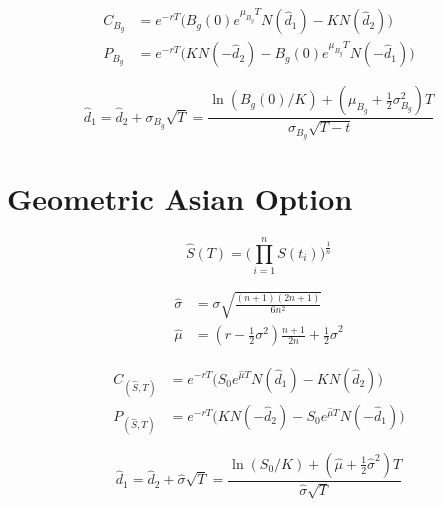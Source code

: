 \documentclass[paper=a4, fontsize=11pt, twocolumn]{scrartcl} %
\numberwithin{equation}{section} %
\numberwithin{figure}{section} %
\numberwithin{table}{section} %
\begin{document}
\begin{equation}
	\begin{split}
		C_{B_g} & = e^{-rT}\big(B_g(0)e^{\mu_{B_g}T}N(\hat{d}_1) - KN(\hat{d}_2)\big)\\
		P_{B_g} & = e^{-rT}\big(KN(-\hat{d}_2) -B_g(0)e^{\mu_{B_g}T}N(-\hat{d}_1)  \big)
	\end{split}
\end{equation}

\begin{equation}
	\hat{d}_1=\hat{d}_2+\sigma_{B_g} \sqrt{T}=\frac{\ln(B_g(0)/K)+(\mu_{B_g}+\frac{1}{2}\sigma^2_{B_g})T}{\sigma_{B_g}\sqrt{T-t}}
\end{equation}

\section{Geometric Asian Option}
\begin{equation}
	\hat{S}(T)=\big(\prod_{i=1}^n S(t_i)\big)^{\frac{1}{n}}
\end{equation}

\begin{equation}
	\begin{split}
		\hat{\sigma} & = \sigma \sqrt{\frac{(n+1)(2n+1)}{6n^2}} \\
		\hat{\mu}    & = (r-\frac{1}{2}\sigma^2)\frac{n+1}{2n}+\frac{1}{2}\hat{\sigma}^2
	\end{split}
\end{equation}

\begin{equation}
	\begin{split}
		C_(\hat{S}, T) &=e^{-rT}\big(S_0e^{\hat{\mu}T}N(\hat{d}_1)-KN(\hat{d}_2)\big)\\
		P_(\hat{S}, T) &=e^{-rT}\big(KN(-\hat{d}_2)-S_0e^{\hat{\mu}T}N(-\hat{d}_1)\big)
	\end{split}
\end{equation}

\begin{equation}
	\hat{d}_1=\hat{d}_2+\hat{\sigma}\sqrt{T}=\frac{\ln(S_0/K)+(\hat{\mu}+\frac{1}{2}\hat{\sigma}^2)T}{\hat{\sigma}\sqrt{T}}
\end{equation}
\end{document}
